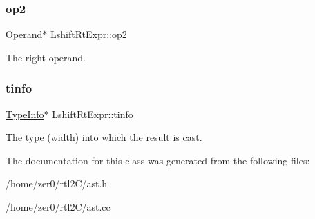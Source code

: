 \subsubsection{\texorpdfstring{op2}{op2}}
{\footnotesize\ttfamily \hyperlink{class_operand}{Operand}$\ast$ Lshift\+Rt\+Expr\+::op2\hspace{0.3cm}{\ttfamily [protected]}}

The right operand. \mbox{\label{class_lshift_rt_expr_a7ebf86b2188b80b5ab5e5b63414d6f6f}} 
\subsubsection{\texorpdfstring{tinfo}{tinfo}}
{\footnotesize\ttfamily \hyperlink{class_type_info}{Type\+Info}$\ast$ Lshift\+Rt\+Expr\+::tinfo\hspace{0.3cm}{\ttfamily [protected]}}

The type (width) into which the result is cast. 

The documentation for this class was generated from the following files\+:\begin{DoxyCompactItemize}
\item 
/home/zer0/rtl2\+C/ast.\+h\item 
/home/zer0/rtl2\+C/ast.\+cc\end{DoxyCompactItemize}
